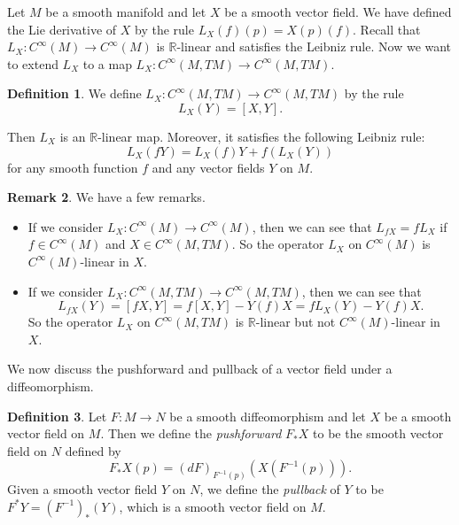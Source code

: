 \documentclass{amsart}
\numberwithin{equation}{section}
\newcommand{\bR}{\mathbb{R}}
\theoremstyle{definition}
\newtheorem{definition}{Definition} [section]
\newtheorem{remark}[definition]{Remark}
\theoremstyle{theorem}
\begin{document}
\bigskip


Let $M$ be a smooth manifold and let $X$ be a smooth vector field. We have defined the Lie derivative of $X$ by the rule $L_X(f)(p) = X(p)(f)$. Recall that $L_X : C^\infty(M) \to C^{\infty}(M)$ is $\mathbb{R}$-linear and satisfies the Leibniz rule. Now we want to extend $L_X$ to a map $L_X : C^\infty(M,TM) \to C^\infty(M,TM)$. 

\begin{definition}
We define $L_X : C^\infty(M, TM) \to C^\infty(M,TM)$ by the rule 
\[
L_X(Y) = [X,Y].
\]
\end{definition}

Then $L_X$ is an $\bR$-linear map. Moreover, it satisfies the following Leibniz rule:  
\[
L_X(fY) = L_X(f)Y + f(L_X(Y))
\]
for any smooth function $f$ and any vector fields $Y$ on $M$. 

\begin{remark}We have a few remarks. 
\begin{itemize}
\item If we consider $L_X : C^\infty(M) \to C^\infty(M)$, then we can see that $L_{fX} = fL_X$
if $f\in C^\infty(M)$ and $X\in C^\infty(M,TM)$.  
So the operator $L_X$ on $C^\infty(M)$ is $C^\infty(M)$-linear in $X$.  
\item If we consider $L_X : C^\infty(M,TM) \to C^\infty(M,TM)$, then we can see that 
\[
L_{fX}(Y) = [fX,Y] = f[X,Y] - Y(f)X = fL_X(Y) - Y(f)X.
\]
So the operator $L_X$ on $C^\infty(M,TM)$ is $\bR$-linear but not $C^\infty(M)$-linear in $X$.
\end{itemize}
\end{remark}

We now discuss the pushforward and pullback of a vector field under a diffeomorphism. 

\begin{definition}
Let $F : M \to N$ be a smooth diffeomorphism and let $X$ be a smooth vector field on $M$. 
Then we define the {\em pushforward} $F_*X$ to be the smooth vector field on $N$ defined by 
\[
F_*X(p) =  (dF)_{F^{-1}(p)}(X(F^{-1}(p))). 
\]
Given a smooth vector field $Y$ on $N$, we define the {\em pullback} of $Y$ to be $F^*Y = (F^{-1})_*(Y)$,
which is a smooth vector field on $M$. 
\end{definition}
\end{document}
